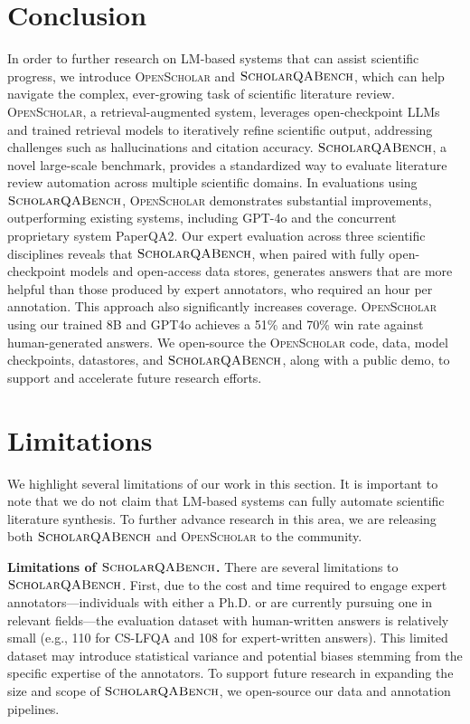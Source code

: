 \documentclass{article} %
\newcommand{\data}{$\textsc{ScholarQABench}$\xspace}
\newcommand{\model}{\textsc{OpenScholar}\xspace}
\renewcommand{\paragraph}[1]{\noindent \textbf{#1}}
\begin{document}



\section{Conclusion}

In order to further research on LM-based systems that can assist scientific progress, we introduce \model and \data, which can help navigate the complex, ever-growing task of scientific literature review. 
\model, a retrieval-augmented system, leverages open-checkpoint LLMs and trained retrieval models to iteratively refine scientific output, addressing challenges such as hallucinations and citation accuracy. 
\data, a novel large-scale benchmark, provides a standardized way to evaluate literature review automation across multiple scientific domains. 
In evaluations using \data, \model demonstrates substantial improvements, outperforming existing systems, including GPT-4o and the concurrent proprietary system PaperQA2. Our expert evaluation across three scientific disciplines reveals that \data, when paired with fully open-checkpoint models and open-access data stores, generates answers that are more helpful than those produced by expert annotators, who required an hour per annotation. This approach also significantly increases coverage. 
\model using our trained 8B and GPT4o  achieves a 51\% and 70\% win rate against human-generated answers. 
We open-source the \model code, data, model checkpoints, datastores, and \data, along with a public demo, to support and accelerate future research efforts. 

\section*{Limitations}
We highlight several limitations of our work in this section. It is important to note that we do not claim that LM-based systems can fully automate scientific literature synthesis. 
To further advance research in this area, we are releasing both \data and \model to the community. 

\paragraph{Limitations of \data.}
There are several limitations to \data. First, due to the cost and time required to engage expert annotators—individuals with either a Ph.D. or are currently pursuing one in relevant fields—the evaluation dataset with human-written answers is relatively small (e.g., 110 for CS-LFQA and 108 for expert-written answers). This limited dataset may introduce statistical variance and potential biases stemming from the specific expertise of the annotators. To support future research in expanding the size and scope of \data, we open-source our data and annotation pipelines.
\end{document}
